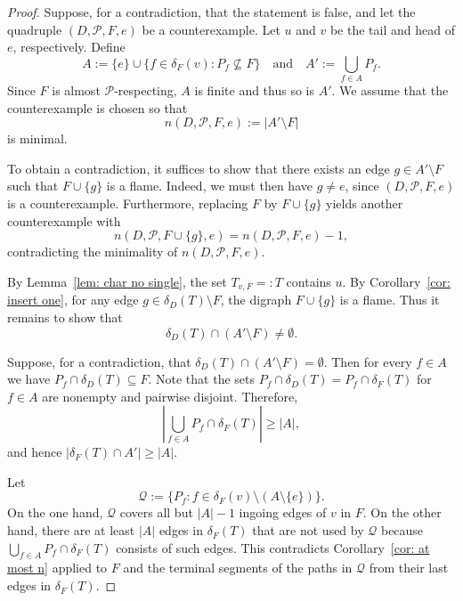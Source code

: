 \documentclass[10pt,a4paper]{amsart}
\begin{document}
\begin{proof}
Suppose, for a contradiction, that the statement is false, and let the quadruple
$(D,\mathcal{P},F,e)$ be a counterexample. Let $u$ and $v$ be the tail and head of $e$,
respectively. Define
\[
A:=\{e\}\cup\{f\in \delta_F(v) : P_f\not\subseteq F\}
\quad\text{and}\quad
A':=\bigcup_{f\in A} P_f .
\]
Since $F$ is almost $\mathcal{P}$-respecting,  $A$ is finite and thus so is  $A'$. We assume
that the counterexample is chosen so that
\[
n(D,\mathcal{P},F,e):=\lvert A'\setminus F\rvert
\]
is minimal.

To obtain a contradiction, it suffices to show that there exists an edge
$g\in A'\setminus F$ such that $F\cup\{g\}$ is a flame. Indeed, we must then have
$g\neq e$, since $(D,\mathcal{P},F,e)$ is a counterexample. Furthermore, replacing $F$ by
$F\cup\{g\}$ yields another counterexample with
\[
n(D,\mathcal{P},F\cup\{g\},e)=n(D,\mathcal{P},F,e)-1,
\]
contradicting the minimality of $n(D,\mathcal{P},F,e)$.

By Lemma~\ref{lem: char no single}, the set $T_{v,F}=:T$ contains $u$. By
Corollary~\ref{cor: insert one}, for any edge $g\in \delta_D(T)\setminus F$, the digraph
$F\cup\{g\}$ is a flame. Thus it remains to show that
\[
\delta_D(T)\cap(A'\setminus F)\neq\emptyset.
\]

Suppose, for a contradiction, that $\delta_D(T)\cap(A'\setminus F)=\emptyset$. Then for
every $f\in A$ we have $P_f\cap \delta_D(T)\subseteq F$. Note that the sets $P_f\cap \delta_D(T)=P_f\cap \delta_F(T)$ for $f\in A$
are nonempty and pairwise disjoint. Therefore,
\[
\left|\bigcup_{f\in A} P_f\cap \delta_F(T)\right|\geq |A|,
\]
and hence $|\delta_F(T)\cap A'|\geq |A|$.

Let
\[
\mathcal{Q}:=\{P_f : f\in \delta_F(v)\setminus(A\setminus\{e\})\}.
\]
On the one hand, $\mathcal{Q}$ covers all but $|A|-1$ ingoing edges of $v$ in $F$. On the
other hand, there are at least $|A|$ edges in
$\delta_F(T)$ that are not used by $\mathcal{Q}$ because $\bigcup_{f\in A} P_f\cap \delta_F(T)$ consists of such edges. This contradicts
Corollary~\ref{cor: at most n} applied to $F$  and the terminal segments of the paths in $\mathcal{Q}$ from their last edges in $\delta_{F}(T)$.
\end{proof}
\end{document}
